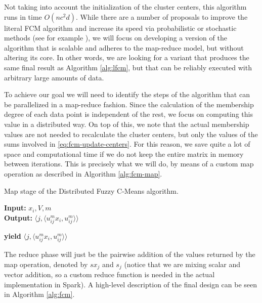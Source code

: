 Not taking into account the initialization of the cluster centers, this algorithm runs in time $O(nc^2d)$. While there are a number of proposals to improve the literal FCM algorithm and increase its speed via probabilistic or stochastic methods (see for example \cite{pham2001probabilistic}), we will focus on developing a version of the algorithm that is scalable and adheres to the map-reduce model, but without altering its core. In other words, we are looking for a variant that produces the same final result as Algorithm \ref{alg:lfcm}, but that can be reliably executed with arbitrary large amounts of data.

To achieve our goal we will need to identify the steps of the algorithm that can be parallelized in a map-reduce fashion. Since the calculation of the membership degree of each data point is independent of the rest, we focus on computing this value in a distributed way. On top of this, we note that the actual membership values are not needed to recalculate the cluster centers, but only the values of the sums involved in \eqref{eq:fcm-update-centers}. For this reason, we save quite a lot of space and computational time if we do not keep the entire matrix in memory between iterations. This is precisely what we will do, by means of a custom map operation as described in Algorithm \ref{alg:fcm-map}.

\begin{algorithm}
  \caption{Map stage of the Distributed Fuzzy C-Means algorithm.}
    \label{alg:fcm-map}
    \textbf{Input:} $x_i,V,m$\\
    \textbf{Output:} $\langle j, \langle u_{ij}^m x_i, u_{ij}^m \rangle \rangle$
  \begin{algorithmic}[1]
      \State \textbf{yield} $\langle j, \langle u_{ij}^m x_i, u_{ij}^m \rangle \rangle$ 
    \EndFor
  \end{algorithmic}
\end{algorithm}

The reduce phase will just be the pairwise addition of the values returned by the map operation, denoted by $sx_j$ and $s_j$ (notice that we are mixing scalar and vector addition, so a custom reduce function is needed in the actual implementation in Spark). A high-level description of the final design can be seen in Algorithm \ref{alg:fcm}.

